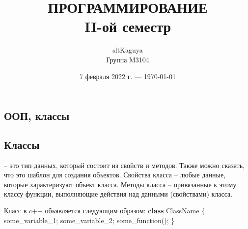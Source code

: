 \documentclass[a4paper,12pt]{article}
\title{ПРОГРАММИРОВАНИЕ\\
    \large II-ой семестр}
\author{sltKaguya\\
    Группа M3104}
\date{7 февраля 2022 г. --- \today}
\begin{document}
\maketitle
\newpage
{}
\begin{center}
    \section*{ООП, классы}
\end{center}
\subsection*{Классы}

 -- это тип данных, который состоит из свойств и методов. Также можно сказать, что это шаблон для создания объектов. Свойства класса -- любые данные, которые характеризуют объект класса. Методы класса -- привязанные к этому классу функции, выполняющие действия над данными (свойствами) класса.

Класс в c++ объявляется следующим образом:
\vspace{6pt}\newline
\textbf{class} ClassName \{\newline
some\_variable\_1;\newline
some\_variable\_2;\newline
some\_function();\newline
\}
\end{document}
